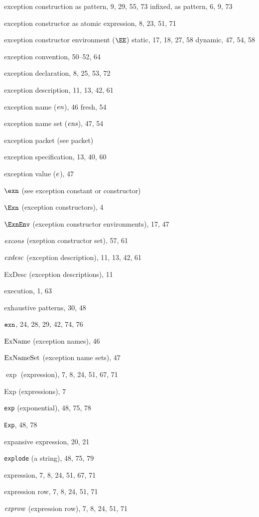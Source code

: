 \begin{theindex}
\item exception construction 
\subitem as pattern, 9, 29, 55, 73
\subitem infixed, as pattern, 6, 9, 73
\item exception constructor 
\subitem as atomic expression, 8, 23, 51, 71
\item exception constructor environment ($\EE$) 
\subitem static, 17, 18, 27, 58
\subitem dynamic, 47, 54, 58
\item exception convention, 50--52, 64
\item exception declaration, 8, 25, 53, 72
\item exception description, 11, 13, 42, 61
\item exception name ($\mbox{\it en}$), 46
\subitem fresh, 54
\item exception name set ($\mbox{\it ens}$), 47, 54
\item exception packet (see packet) 
\item exception specification, 13, 40, 60
\item exception value ($e$), 47
\item $\exn$ (see exception constant or constructor) 
\item $\Exn$ (exception constructors), 4
\item $\ExnEnv$ (exception constructor environments), 17, 47
\item $\mbox{\it excons}$ (exeption constructor set), 57, 61
\item ${\it exdesc}$ (exception description), 11, 13, 42, 61
\item ExDesc (exception descriptions), 11
\item execution, 1, 63
\item exhaustive patterns, 30, 48
\item $\mbox{\tt exn}$, 24, 28, 29, 42, 74, 76
\item ${\rm ExName}$ (exception names), 46
\item ${\rm ExNameSet}$ (exception name sets), 47
\item $\exp$ (expression), 7, 8, 24, 51, 67, 71
\item Exp (expressions), 7
\item {\tt exp} (exponential), 48, 75, 78
\item {\tt Exp}, 48, 78
\item expansive expression, 20, 21
\item {\tt explode} (a string), 48, 75, 79
\item expression, 7, 8, 24, 51, 67, 71
\item expression row, 7, 8, 24, 51, 71
\item ${\it exprow}$ (expression row), 7, 8, 24, 51, 71

\end{theindex}
